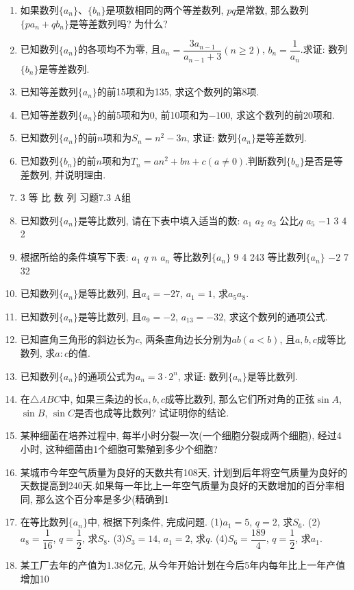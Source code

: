 \documentclass[10pt,a4paper]{article}
\begin{document}
\begin{enumerate}[1.]
\item 如果数列$\{a_n\}$、$\{b_n\}$是项数相同的两个等差数列, $pq$是常数, 那么数列$\{pa_n+qb_n\}$是等差数列吗? 为什么?
\item 已知数列$\{a_n\}$的各项均不为零, 且$a_n=\dfrac{3{a_{n-1}}}{{a_{n-1}}+3}(n\ge 2)$, $b_n=\dfrac 1{a_n}$.求证: 数列$\{b_n\}$是等差数列.
\item 已知等差数列$\{a_n\}$的前15项和为135, 求这个数列的第8项.
\item 已知等差数列$\{a_n\}$的前5项和为0, 前10项和为$-100$, 求这个数列的前20项和.
\item 已知数列$\{a_n\}$的前$n$项和为$S_n=n^2-3n$, 求证: 数列$\{a_n\}$是等差数列.
\item 已知数列$\{b_n\}$的前$n$项和为$T_n=an^2+bn+c(a\ne 0)$.判断数列$\{b_n\}$是否是等差数列, 并说明理由.
\item 3  等 比 数 列
习题7.3  A组
\item 已知数列$\{a_n\}$是等比数列, 请在下表中填入适当的数:
$a_1$	$a_2$	$a_3$	公比$q$	$a_5$
    $-1$	3		
    4		2	
\item 根据所给的条件填写下表:
    $a_1$	$q$	$n$	$a_n$
等比数列$\{a_n\}$	9		4	243
等比数列$\{a_n\}$		$-2$	7	32
\item 已知数列$\{a_n\}$是等比数列, 且$a_4=-27$, $a_1=1$, 求$a_5a_8$.
\item 已知数列$\{a_n\}$是等比数列, 且$a_9=-2$, $a_{13}=-32$, 求这个数列的通项公式.
\item 已知直角三角形的斜边长为$c$, 两条直角边长分别为$ab(a<b)$, 且$a,b,c$成等比数列, 求$a:c$的值.
\item 已知数列$\{a_n\}$的通项公式为$a_n=3\cdot 2^n$, 求证: 数列$\{a_n\}$是等比数列.
\item 在$\triangle ABC$中, 如果三条边的长$a,b,c$成等比数列, 那么它们所对角的正弦$\sin A$, $\sin B$, $\sin C$是否也成等比数列? 试证明你的结论.
\item 某种细菌在培养过程中, 每半小时分裂一次(一个细胞分裂成两个细胞), 经过4小时, 这种细菌由1个细胞可繁殖到多少个细胞?
\item 某城市今年空气质量为良好的天数共有108天, 计划到后年将空气质量为良好的天数提高到240天.如果每一年比上一年空气质量为良好的天数增加的百分率相同, 那么这个百分率是多少(精确到1%
\item 在等比数列$\{a_n\}$中, 根据下列条件, 完成问题.
(1)$a_1=5$, $q=2$, 求$S_6$.
(2)$a_8=\dfrac 1{16}$, $q=\dfrac 12$, 求$S_8$.
(3)$S_3=14$, $a_1=2$, 求$q$.
(4)$S_6=\dfrac{189}4$, $q=\dfrac 12$, 求$a_1$.
\item 某工厂去年的产值为1.38亿元, 从今年开始计划在今后5年内每年比上一年产值增加10%

\end{enumerate}
\end{document}
